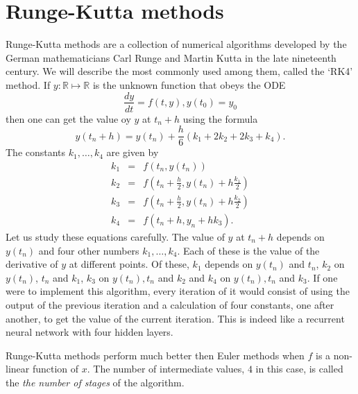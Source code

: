 \documentclass{article}
\numberwithin{equation}{section}
\begin{document}
\section{Runge-Kutta methods}\label{s6}
Runge-Kutta methods are a collection of numerical algorithms developed by
the German mathematicians Carl Runge and Martin Kutta in the late 
nineteenth century\cite{lambert1991numerical}. We will describe the most
commonly used among them, called the `RK4' method. If $y: \mathbb{R}
\mapsto \mathbb{R}$ is the unknown function that obeys the ODE
\begin{equation}\label{s6e1}
\frac{dy}{dt} = f(t, y), y(t_0) = y_0
\end{equation}
then one can get the value oy $y$ at $t_n + h$ using the formula
\begin{equation}\label{s6e2}
y(t_n + h) = y(t_n) + \frac{h}{6}(k_1 + 2k_2 + 2k_3 + k_4).
\end{equation}
The constants $k_1, \ldots, k_4$ are given by
\begin{eqnarray}
k_1 &=& f(t_n, y(t_n)) \label{s6e3} \\
k_2 &=& f\left(t_n + \frac{h}{2}, y(t_n) + h\frac{k_1}{2}\right) 
 \label{s6e4} \\
k_3 &=& f\left(t_n + \frac{h}{2}, y(t_n) + h\frac{k_2}{2}\right) 
 \label{s6e5} \\
k_4 &=& f(t_n + h, y_n + hk_3). \label{s6e6}
\end{eqnarray}
Let us study these equations carefully. The value of $y$ at $t_n + h$ 
depends on $y(t_n)$ and four other numbers $k_1, \ldots, k_4$. Each of
these is the value of the derivative of $y$ at different points. Of these,
$k_1$ depends on $y(t_n)$ and $t_n$, $k_2$ on $y(t_n)$, $t_n$ and $k_1$,
$k_3$ on $y(t_n), t_n$ and $k_2$ and $k_4$ on $y(t_n), t_n$ and $k_3$. If
one were to implement this algorithm, every iteration of it would consist
of using the output of the previous iteration and a calculation of four
constants, one after another, to get the value of the current iteration.
This is indeed like a recurrent neural network with four hidden layers.

Runge-Kutta methods perform much better then Euler methods when $f$ is 
a non-linear function of $x$. The number of intermediate values, $4$ in 
this case, is called the \emph{the number of stages} of the algorithm.
\end{document}
